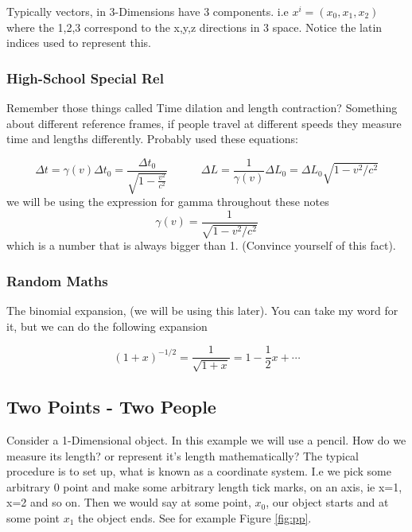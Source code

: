 Typically vectors, in 3-Dimensions have 3 components. i.e $x^i = (x_0 , x_1, x_2)$ where the 1,2,3 correspond to the x,y,z directions in 3 space. Notice the latin indices used to represent this. 

\subsubsection{High-School Special Rel}

Remember those things called Time dilation and length contraction? Something about different reference frames, if people travel at different speeds they measure time and lengths differently. Probably used these equations:

\begin{equation}
  \Delta t = \gamma(v) \Delta t_0 = \frac{\Delta t_0}{\sqrt{1 - \frac{v^2}{c^2}}}  \quad \quad \quad \Delta L = \frac{1}{\gamma(v)} \Delta L_0 =\Delta L_0 \sqrt{1 - v^2/c^2} 
  \label{eq:specialrel}
\end{equation}
we will be using the expression for gamma throughout these notes
\begin{equation}
  \gamma(v) = \frac{1}{\sqrt{1 - v^2/c^2}}
\end{equation}
which is a number that is always bigger than 1. (Convince yourself of this fact). 


\subsubsection{Random Maths}
The binomial expansion, (we will be using this later). You can take my word for it, but we can do the following expansion

\begin{equation}
  (1 + x)^{-1/2} = \frac{1}{\sqrt{1 +x}} = 1 - \frac{1}{2}x + \cdots
  \label{eq:binom}
\end{equation}



\subsection{Two Points - Two People}

Consider a 1-Dimensional object. In this example we will use a pencil. How do we measure its length? or represent it's length mathematically? The typical procedure is to set up, what is known as a coordinate system. I.e we pick some arbitrary 0 point and make some arbitrary length tick marks, on an axis, ie x=1, x=2 and so on. Then we would say at some point, $x_0$, our object starts and at some point $x_1$ the object ends. See for example Figure \ref{fig:pp}. 


